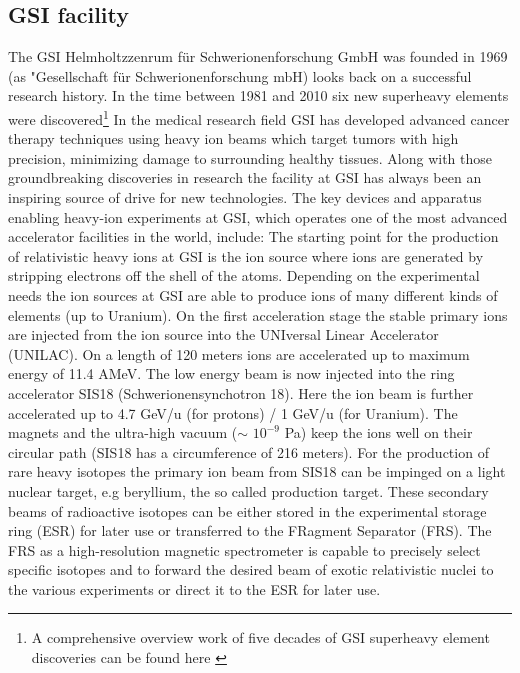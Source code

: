 \subsection{GSI facility}
The GSI Helmholtzzenrum f\"ur Schwerionenforschung GmbH was founded in 1969 (as "Gesellschaft f\"ur Schwerionenforschung mbH) looks back on a successful research history. In the time between 1981 and 2010 six new  superheavy elements were discovered\footnote{A comprehensive overview work of five decades of GSI superheavy element discoveries can be found here \cite{dullmann2022five}} \newline
In the medical research field GSI has developed advanced cancer therapy techniques using heavy ion beams which target tumors with high precision, minimizing damage to surrounding healthy tissues.\newline
Along with those groundbreaking discoveries in research the facility at GSI has always been an inspiring source of drive for new technologies.\newline
The key devices and apparatus enabling heavy-ion experiments at GSI, which operates one of the most advanced accelerator facilities in the world, include:\newline
The starting point for the production of relativistic heavy ions at GSI is the ion source where ions are generated by stripping electrons off the shell of the atoms. Depending on the experimental needs the ion sources at GSI are able to produce ions of many different kinds of elements (up to Uranium)\cite{ion_sources_web}.\newline
On the first acceleration stage the stable primary ions are injected from the ion source into the UNIversal Linear Accelerator (UNILAC). On a length of 120 meters ions are accelerated up to maximum energy of 11.4 AMeV. The low energy beam is now injected into the ring accelerator SIS18 (Schwerionensynchotron 18). Here the ion beam is further accelerated up to 4.7 GeV/u (for protons) / 1 GeV/u (for Uranium). The magnets and  the ultra-high vacuum ($\sim$ $10^{-9}$ Pa) keep the ions well on their circular path (SIS18 has a circumference of 216 meters)\cite{sis18_web}. For the production of rare heavy isotopes the primary ion beam from SIS18 can be impinged on a light nuclear target, e.g beryllium, the so called production target. These secondary beams of radioactive isotopes can be either stored in the experimental storage ring (ESR) for later use or transferred to the FRagment Separator (FRS). The FRS as a high-resolution magnetic spectrometer is capable to precisely select specific isotopes and to forward the desired beam of exotic relativistic nuclei to the various experiments or direct it to the ESR for later use.\newline
